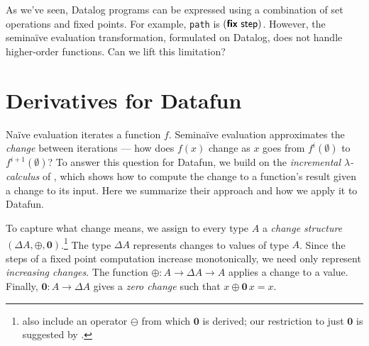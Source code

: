 \documentclass[sigplan,screen,dvipsnames]{acmart}
\newcommand{\naive}{na\"ive}
\newcommand{\Naive}{Na\"ive}
\newcommand{\D}{\Delta}
\renewcommand{\d}{\delta}
\newcommand{\zero}{\mathbf{0}}
\newcommand{\kw}[1]{\textsf{\bfseries #1}}
\newcommand{\tlv}[1]{\textsf{#1}}
\newcommand{\var}[1]{\mathit{#1}}
\newcommand{\dee}[1]{\var{d#1}}
\newcommand{\efix}{\kw{fix}~}
\begin{document}
As we've seen, Datalog programs can be expressed using a combination of set
operations and fixed points. For example, \texttt{path} is
$(\efix{\tlv{step}})$. However, the semi\naive{} evaluation transformation,
formulated on Datalog, does not handle higher-order functions. Can we lift this limitation?

\section{Derivatives for Datafun}

\Naive{} evaluation iterates a function $f$.
%
Semi\naive{} evaluation approximates the \emph{change} between iterations ---
how does $f(x)$ change as $x$ goes from $f^{i}(\emptyset)$ to
$f^{i+1}(\emptyset)$?
%
To answer this question for Datafun, we build on the \emph{incremental
  $\lambda$-calculus} of \citet{incremental}, which shows how to compute the
change to a function's result given a change to its input.
%
Here we summarize their approach and how we apply it to Datafun.


To capture what change means, we assign to every type $A$ a \emph{change
  structure} $(\D A, \oplus, \zero)$.\footnote{ also
  include an operator $\ominus$ from which $\zero$ is derived; our restriction
  to just $\zero$ is suggested by \citet{atkey-changes}.}
%
The type $\D A$ represents changes to values of type $A$. Since the steps of a fixed point computation increase monotonically, we need only represent \emph{increasing changes}.
%
The function $\oplus : A \to \Delta A \to A$ applies a change to a value.
Finally, $\zero : A \to \Delta A$ gives a \emph{zero change} such that $x \oplus
\zero\,x = x$.
\end{document}
